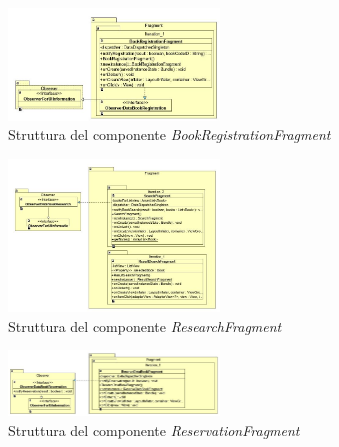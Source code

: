 \begin{figure}[h!]
	\centering
	\includegraphics[width=0.5\textwidth]{Immagini/BookRegistrationFragment}
	\caption{Struttura del componente \textit{BookRegistrationFragment}}
	\label{fig:BookRegistrationFragment}
\end{figure}

\begin{figure} [h!]
	\centering
	\includegraphics[width=0.5\textwidth]{Immagini/ResearchFragment.jpg}
	\caption{Struttura del componente \textit{ResearchFragment}}
	\label{fig:ResearchFragment}
\end{figure}

\begin{figure} [h!]
	\centering
	\includegraphics[width=0.5\textwidth]{Immagini/ReservationFragment.jpg}
	\caption{Struttura del componente \textit{ReservationFragment}}
	\label{fig:ReservationFragment}
\end{figure}